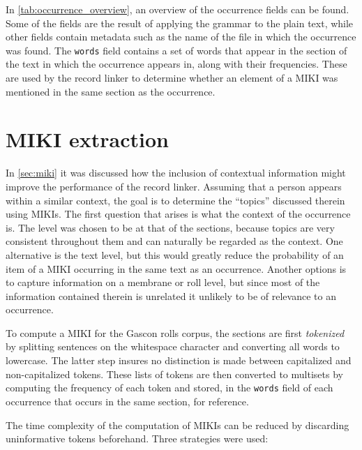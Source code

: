 In \cref{tab:occurrence_overview}, an overview of the occurrence fields can be found.
Some of the fields are the result of applying the grammar to the plain text, while other fields contain metadata such as the name of the file in which the occurrence was found.
The \texttt{words} field contains a set of words that appear in the section of the text in which the occurrence appears in, along with their frequencies.
These are used by the record linker to determine whether an element of a MIKI was mentioned in the same section as the occurrence.




\section{MIKI extraction}
\label{sec:miki_evaluation}

In \cref{sec:miki} it was discussed how the inclusion of contextual information might improve the performance of the record linker.
Assuming that a person appears within a similar context, the goal is to determine the ``topics'' discussed therein using MIKIs.
The first question that arises is what the context of the occurrence is.
The level was chosen to be at that of the sections, because topics are very consistent throughout them and can naturally be regarded as the context.
One alternative is the text level, but this would greatly reduce the probability of an item of a MIKI occurring in the same text as an occurrence.
Another options is to capture information on a membrane or roll level, but since most of the information contained therein is unrelated it unlikely to be of relevance to an occurrence.

To compute a MIKI for the Gascon rolls corpus, the sections are first \emph{tokenized} by splitting sentences on the whitespace character and converting all words to lowercase.
The latter step insures no distinction is made between capitalized and non-capitalized tokens.
These lists of tokens are then converted to multisets by computing the frequency of each token and stored, in the \texttt{words} field of each occurrence that occurs in the same section, for reference.

The time complexity of the computation of MIKIs can be reduced by discarding uninformative tokens beforehand.
Three strategies were used:

